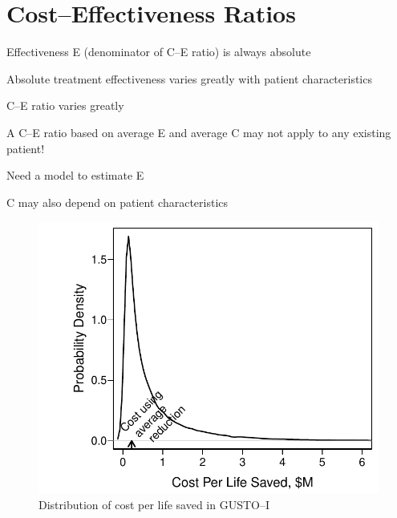 \section{Cost--Effectiveness Ratios}
\bi
\item   Effectiveness E (denominator of C--E ratio) is always absolute
\item   Absolute treatment effectiveness varies greatly with patient
        characteristics
\item   \ra C--E ratio varies greatly
\item   A C--E ratio based on average E and average C
        may not apply to any existing patient!
\item   Need a model to estimate E
\item   C may also depend on patient characteristics
\begin{Schunk}
\begin{figure}[htbp]

\centerline{\includegraphics[width=\maxwidth]{ancova-gusto-histcost-1} }

\caption[Distribution of cost per life saved in GUSTO--I]{Distribution of cost per life saved in GUSTO--I}\label{fig:ancova-gusto-histcost}
\end{figure}
\end{Schunk}
\ei

